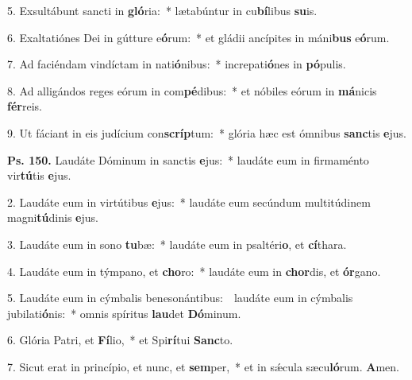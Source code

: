 5. Exsultábunt sancti in \textbf{gló}ria:~* lætabúntur in cu\textbf{bí}libus \textbf{su}is.

6. Exaltatiónes Dei in gútture e\textbf{ó}rum:~* et gládii ancípites in máni\textbf{bus} e\textbf{ó}rum.

7. Ad faciéndam vindíctam in nati\textbf{ó}nibus:~* increpati\textbf{ó}nes in \textbf{pó}pulis.

8. Ad alligándos reges eórum in com\textbf{pé}dibus:~* et nóbiles eórum in \textbf{má}nicis \textbf{fér}reis.

9. Ut fáciant in eis judícium con\textbf{scríp}tum:~* glória hæc est ómnibus \textbf{sanc}tis \textbf{e}jus.

\textbf{Ps. 150.} Laudáte Dóminum in sanctis \textbf{e}jus:~* laudáte eum in firmaménto vir\textbf{tú}tis \textbf{e}jus.

2. Laudáte eum in virtútibus \textbf{e}jus:~* laudáte eum secúndum multitúdinem magni\textbf{tú}dinis \textbf{e}jus.

3. Laudáte eum in sono \textbf{tu}bæ:~* laudáte eum in psaltéri\textbf{o}, et \textbf{cí}thara.

4. Laudáte eum in týmpano, et \textbf{cho}ro:~* laudáte eum in \textbf{chor}dis, et \textbf{ór}gano.

5. Laudáte eum in cýmbalis benesonántibus:~\GreDagger\ laudáte eum in cýmbalis jubilati\textbf{ó}nis:~* omnis spíritus \textbf{lau}det \textbf{Dó}minum.

6. Glória Patri, et \textbf{Fí}lio,~* et Spi\textbf{rí}tui \textbf{Sanc}to.

7. Sicut erat in princípio, et nunc, et \textbf{sem}per,~* et in s\'{\ae}cula sæcu\textbf{ló}rum. \textbf{A}men.